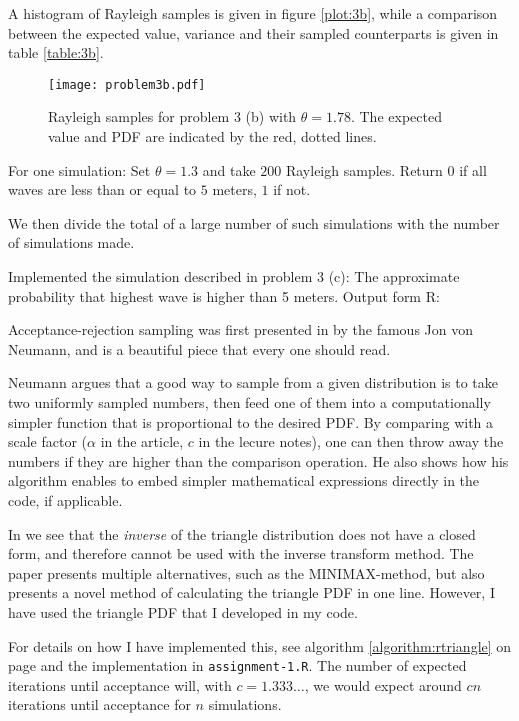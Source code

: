 \documentclass[a4paper,english,12pt]{article}
\begin{document}
A histogram of Rayleigh samples is given in figure \vref{plot:3b}, while a
comparison between the expected value, variance and their sampled counterparts
is given in table \vref{table:3b}.



\begin{figure}
  \centering
  \texttt{[image: problem3b.pdf]}
  \caption{Rayleigh samples for problem 3 (b) with $\theta=1.78$. The expected
  value and PDF are indicated by the red, dotted lines.}
  \label{plot:3b}
\end{figure}

For one simulation: Set $\theta=1.3$ and take $200$ Rayleigh samples. Return
$0$ if all waves are less than or equal to $5$ meters, $1$ if not.

We then divide the total of a large number of such simulations with the number
of simulations made.

\label{problem:3d}
Implemented the simulation described in problem 3 (c): The approximate
probability that highest wave is higher than 5 meters. Output form R:

Acceptance-rejection sampling was first presented in \cite{von1961various} by the
famous Jon von Neumann, and is a beautiful piece that every one should read.

Neumann argues that a good way to sample from a given distribution is to take
two uniformly sampled numbers, then feed one of them into a computationally
simpler function that is proportional to the desired PDF. By comparing with a
scale factor ($\alpha$ in the article, $c$ in the lecure notes), one can then
throw away the numbers if they are higher than the comparison operation. He
also shows how his algorithm enables to embed simpler mathematical expressions
directly in the code, if applicable.

In \cite{STEIN20091143} we see that the \textit{inverse} of the triangle
distribution does not have a closed form, and therefore cannot be used with the
inverse transform method. The paper presents multiple alternatives, such as the
MINIMAX-method, but also presents a novel method of calculating the triangle
PDF in one line. However, I have used the triangle PDF that I developed in my
code.

For details on how I have implemented this, see algorithm
\ref{algorithm:rtriangle} on page \pageref{algorithm:rtriangle} and the
implementation in \texttt{assignment-1.R}. The number of expected iterations
until acceptance will, with $c=1.333\dots$, we would expect around $cn$
iterations until acceptance for $n$ simulations.
\end{document}
